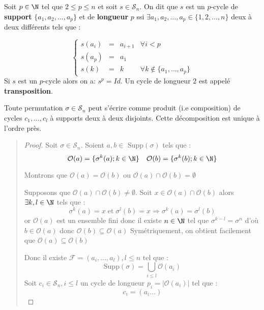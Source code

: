 \begin{definition}[Cycle]
	Soit $p \in \N$ tel que $ 2 \leq p \leq n $ et soit $s \in \mathcal{S}_n$.
    On dit que $s$ est un $p$-cycle de \textbf{support} $\{a_1, a_2, \dots , a_p \}$ et de \textbf{longueur} $p$ ssi $ \exists a_1, a_2, \dots , a_p \in \{1, 2, \dots , n\}$ deux à deux différents tels que :
    
    \[
        \left \{
            \begin{array}{cccc }
                s(a_i) & = & a_{i+1} & \forall i < p \\
                s(a_p) & = & a_1 & \\
                s(k) & = & k & \forall k \not \in \{a_1, \dots , a_p\}
            \end{array}
        \right.
    \]
	Si $s$ est un $p$-cycle alors on a: $ { s^p = Id} $.
	Un cycle de longueur $2$ est appelé \textbf{transposition}.
\end{definition}

\begin{theorem}
		Toute permutation $\sigma \in \mathcal{S}_n$ peut s'écrire comme produit (i.e composition) 
		de cycles $c_1,\dots,c_l$ à supports deux à deux disjoints. 
		Cette décomposition est unique à l'ordre près.
\end{theorem}

\begin{quote}
\footnotesize
\begin{proof}
	Soit $\sigma \in \mathcal{S}_n$. Soient $a,b \in \text{ Supp}(\sigma)$ tels que :
		\[ \mathcal{O}(a) = \{\sigma^k(a); k \in \N\} \quad \mathcal{O}(b) = \{\sigma^k(b); k \in \N\} \] 
	\begin{lemma}
		Montrons que $\mathcal{O}(a) = \mathcal{O}(b)$ ou $\mathcal{O}(a) \cap \mathcal{O}(b) = \emptyset $

		Supposons que $\mathcal{O}(a) \cap \mathcal{O}(b) \not = \emptyset $.
		Soit $ x \in \mathcal{O}(a) \cap \mathcal{O}(b)$ alors $\exists k,l \in \N$ tels que :
			\[ \sigma^k(a) = x \; \text{et} \; \sigma^l(b) = x \Longrightarrow \sigma^k(a) =\sigma^l(b) \]
		or $\mathcal{O}(a)$ est un ensemble fini donc il existe $n \in \N$ tel que  $\sigma^{k-l} = \sigma ^n$ 
		d'où $ b \in \mathcal{O}(a)$ donc $\mathcal{O}(b) \subseteq \mathcal{O}(a)$
		Symétriquement, on obtient facilement que $\mathcal{O}(a) \subseteq \mathcal{O}(b)$
	\end{lemma}
	Donc il existe $\mathcal{F} = (a_i, \dots, a_l), l \leq n$ tel que :
		\[ \text{Supp}(\sigma) = \bigcup_{i \leq l} \mathcal{O}(a_i) \] 
	Soit $c_i \in \mathcal{S}_n, i \leq l $ un cycle de longueur $ p_i = | \mathcal{O}(a_i) | $ tel que :
		\[ c_i = (a_i \dots) \] 
\end{proof}
\normalsize
\end{quote}

